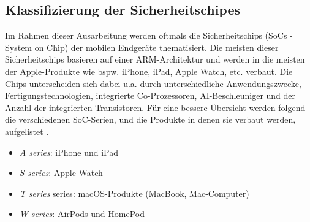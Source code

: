 \subsection{Klassifizierung der Sicherheitschipes}
Im Rahmen dieser Ausarbeitung werden oftmals die Sicherheitschips (SoCs - System on Chip) der mobilen Endgeräte thematisiert. 
Die meisten dieser Sicherheitschips basieren auf einer ARM-Architektur und werden in die meisten der Apple-Produkte wie bspw.
iPhone, iPad, Apple Watch, etc. verbaut. Die Chips unterscheiden sich dabei u.a. durch unterschiedliche Anwendungszwecke, 
Fertigungstechnologien, integrierte Co-Prozessoren, AI-Beschleuniger und der Anzahl der integrierten Transistoren. Für eine 
bessere Übersicht werden folgend die verschiedenen SoC-Serien, und die Produkte
in denen sie verbaut werden, aufgelistet \cite{apple2020}.

\begin{itemize}
\item \textit{A series}: iPhone und iPad
\item \textit{S series}: Apple Watch
\item \textit{T series} series: macOS-Produkte (MacBook, Mac-Computer)
\item \textit{W series}: AirPods und HomePod
\end{itemize}




